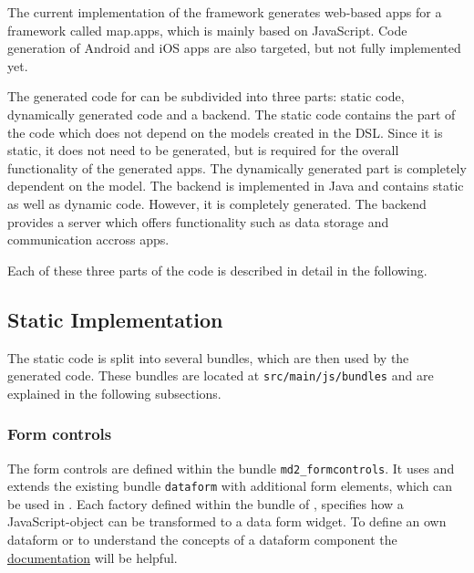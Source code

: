 
The current implementation of the \MD framework generates web-based apps for a framework called map.apps, which is mainly based on JavaScript. Code generation of Android and iOS apps are also targeted, but not fully implemented yet.

The generated code for \mapapps can be subdivided into three parts: static \mapapps code, dynamically generated \mapapps code and a backend. The static \mapapps code contains the part of the code which does not depend on the models created in the \MD DSL. Since it is static, it does not need to be generated, but is required for the overall functionality of the generated apps. The dynamically generated part is completely dependent on the model. The backend is implemented in Java and contains static as well as dynamic code. However, it is completely generated. The backend provides a server which offers functionality such as data storage and communication accross apps.

Each of these three parts of the code is described in detail in the following.


\subsection{Static \mapapps Implementation}

The static \mapapps code is split into several bundles, which are then used by the generated \mapapps code. These bundles are located at \lstinline!src/main/js/bundles!  and are explained in the following subsections.

\subsubsection{Form controls}

The form controls are defined within the bundle \lstinline!md2_formcontrols!. It uses and extends the existing \mapapps bundle \lstinline|dataform| with additional form elements, which can be used in \MD. Each factory defined within the bundle of \MD, specifies how a JavaScript-object can be transformed to a data form widget. To define an own dataform or to understand the concepts of a dataform component the \href{http://developernetwork.conterra.de/documentation/31/developers/dataform}{\mapapps documentation} will be helpful.

